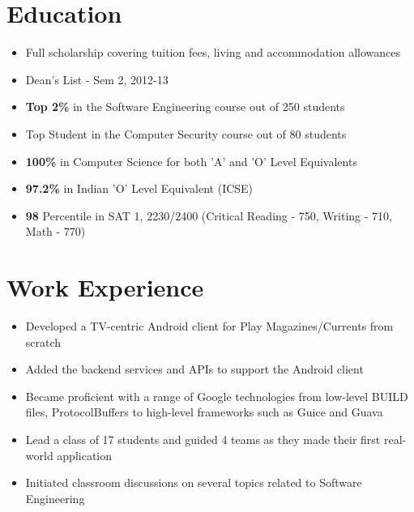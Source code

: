 \documentclass[11pt,a4paper]{moderncv}
\begin{document}
\makecvtitle

\section{Education}
{\begin{itemize}
        \item Full scholarship covering tuition fees, living and accommodation allowances
        \item Dean's List - Sem 2, 2012-13
        \item \textbf{Top 2\%} in the Software Engineering course out of 250 students
        \item Top Student in the Computer Security course out of 80 students
 \end{itemize}}

{\begin{itemize}
        \item \textbf{100\%} in Computer Science for both 'A' and 'O' Level Equivalents
        \item \textbf{97.2\%} in Indian 'O' Level Equivalent (ICSE)
        \item \textbf{98} Percentile in SAT 1, 2230/2400 (Critical Reading - 750, Writing - 710, Math - 770)
 \end{itemize}}

\section{Work Experience}
{\begin{itemize}
        \item Developed a TV-centric Android client for Play Magazines/Currents from scratch
        \item Added the backend services and APIs to support the Android client
        \item Became proficient with a range of Google technologies from low-level BUILD files, ProtocolBuffers to
              high-level frameworks such as Guice and Guava
 \end{itemize}}
{\begin{itemize}
        \item Lead a class of 17 students and guided 4 teams as they made their first real-world application
        \item Initiated classroom discussions on several topics related to Software Engineering
 \end{itemize}}
\end{document}
